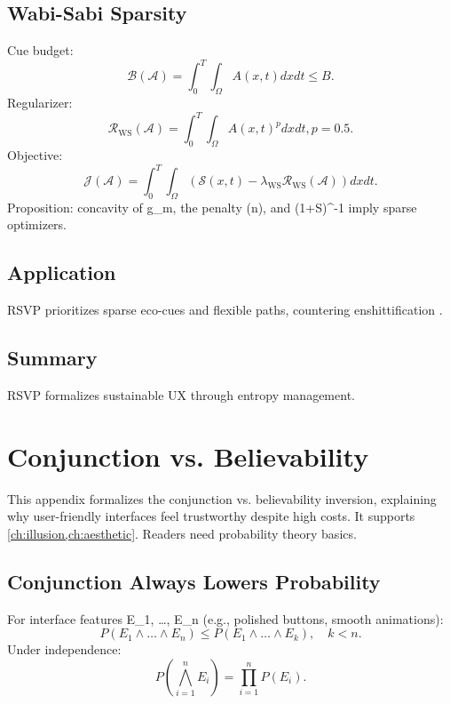 \documentclass[openany]{book}
\begin{document}
\section{Wabi-Sabi Sparsity}
\label{sec:rsvp-wabisabi}
Cue budget:
\begin{equation}
\mathcal{B}(\mathcal{A})=\int_0^T \int_\Omega A(x,t) dx dt \leq B.
\end{equation}
Regularizer:
\begin{equation}
\mathcal{R}_{\mathrm{WS}}(\mathcal{A}) = \int_0^T \int_\Omega A(x,t)^p dx dt, p=0.5.
\end{equation}
Objective:
\begin{equation}
\mathcal{J}(\mathcal{A}) = \int_0^T \int_\Omega (\mathcal{S}(x,t) - \lambda_{\mathrm{WS}} \mathcal{R}_{\mathrm{WS}}(\mathcal{A})) dx dt.
\end{equation}
Proposition: concavity of g_m, the penalty \chi(n), and (1+\rho S)^{-1} imply sparse optimizers.

\section{Application}
\label{sec:rsvp-application}
RSVP prioritizes sparse eco-cues and flexible paths, countering enshittification \citep{doctorow2022}.

\section{Summary}
RSVP formalizes sustainable UX through entropy management.

\chapter{Conjunction vs. Believability}
\label{app:conjunction}

This appendix formalizes the conjunction vs. believability inversion, explaining why user-friendly interfaces feel trustworthy despite high costs. It supports \cref{ch:illusion,ch:aesthetic}. Readers need probability theory basics.

\section{Conjunction Always Lowers Probability}
\label{sec:conj-prob}
For interface features E_1, \dots, E_n (e.g., polished buttons, smooth animations):
\begin{equation}
\label{eq:conj-prob}
P(E_1 \land \dots \land E_n) \leq P(E_1 \land \dots \land E_k), \quad k < n.
\end{equation}
Under independence:
\begin{equation}
\label{eq:conj-indep}
P(\bigwedge_{i=1}^n E_i) = \prod_{i=1}^n P(E_i).
\end{equation}
\end{document}
